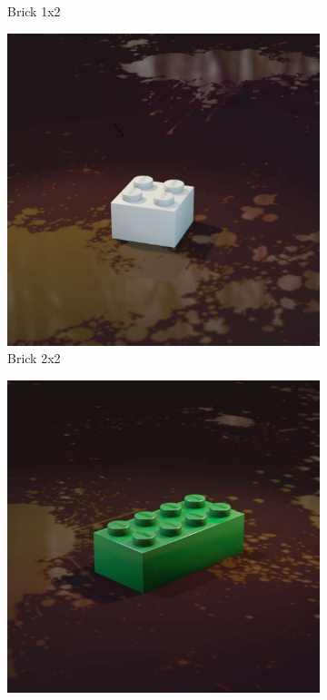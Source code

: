 \documentclass[]{article}
\begin{document}
\begin{figure}[h]
\begin{subfigure}[b]{0.15\textwidth}
        \caption{Brick 1x2}
    \end{subfigure}
    \begin{subfigure}[b]{0.15\textwidth}
        \centering
        \includegraphics[width=\textwidth]{Examples/bricks-2x2.jpg}
        \caption{Brick 2x2}
    \end{subfigure}
    \begin{subfigure}[b]{0.15\textwidth}
        \centering
        \includegraphics[width=\textwidth]{Examples/bricks-2x4.jpg}

\end{subfigure}
\end{figure}
\end{document}
